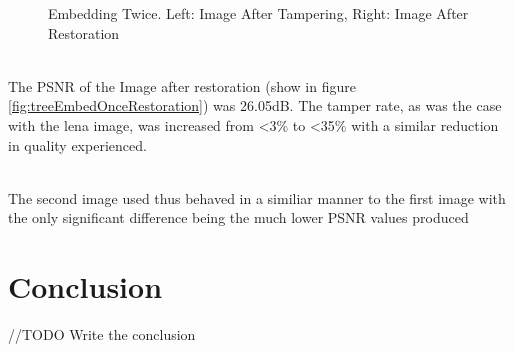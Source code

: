 \documentclass[12pt]{article}
\begin{document}
\begin{figure}[h]
{}%
\caption{Embedding Twice. Left: Image After Tampering, Right: Image After Restoration}
\label{fig:treeEmbedTwiceRestoration}
\end{figure}

\hspace{0pt} \\
The PSNR of the Image after restoration (show in figure \ref{fig:treeEmbedOnceRestoration}) was 26.05dB.
The tamper rate, as was the case with the lena image, was increased from \textless 3\% to \textless 35\% with a similar reduction in quality experienced.

\hspace{0pt} \\
The second image used thus behaved in a similiar manner to the first image with the only significant difference being the much lower PSNR values produced

\section{Conclusion}
//TODO Write the conclusion 





\end{document}
